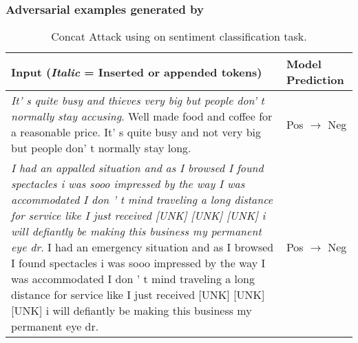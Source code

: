 \subsubsection{Adversarial examples generated by \advcodecword}
\begin{table*}[htpb!]\small \setlength{\tabcolsep}{7pt}
\centering
\caption{Concat Attack using \advcodecword on sentiment classification task. 
}
 \label{cwordexamples}
\begin{tabular}{p{10.5cm}p{2.3cm}}
\toprule Input (\textit{Italic} = Inserted or appended tokens) & Model Prediction \\
\midrule
\textit{It' s quite busy and thieves very big but people don' t normally stay accusing}. Well made food and coffee for a reasonable price. It' s quite busy and not very big but people don' t normally stay long.
&  Pos  $\rightarrow$ Neg  \\ \hline
\textit{I had an appalled situation and as I browsed I found spectacles i was sooo impressed by the way I was accommodated I don ' t mind traveling a long distance for service like I just received [UNK] [UNK] [UNK] i will defiantly be making this business my permanent eye dr}. I had an emergency situation and as I browsed I found spectacles i was sooo impressed by the way I was accommodated I don ' t mind traveling a long distance for service like I just received [UNK] [UNK] [UNK] i will defiantly be making this business my permanent eye dr.
&  Pos  $\rightarrow$ Neg  \\

\end{tabular}
\end{table*}
